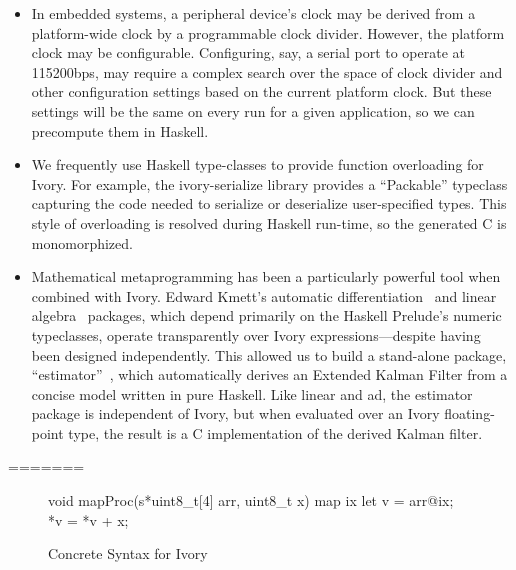 \begin{itemize}
\item In embedded systems, a peripheral device's clock may be derived from a
  platform-wide clock by a programmable clock divider. However, the platform
  clock may be configurable. Configuring, say, a serial port to operate at
  115200bps, may require a complex search over the space of clock divider and
  other configuration settings based on the current platform clock. But these
  settings will be the same on every run for a given application, so we can
  precompute them in Haskell.
\item We frequently use Haskell type-classes to provide function overloading for
  Ivory. For example, the ivory-serialize library provides a ``Packable''
  typeclass capturing the code needed to serialize or deserialize user-specified
  types. This style of overloading is resolved during Haskell run-time, so the
  generated C is monomorphized.
\item Mathematical metaprogramming has been a particularly powerful tool when combined
with Ivory. Edward Kmett's automatic differentiation~\cite{ad} and linear
algebra~\cite{linear} packages, which depend primarily on the Haskell Prelude's
numeric typeclasses, operate transparently over Ivory expressions---despite
having been designed independently. This allowed us to build a stand-alone
package, ``estimator''~\cite{estimator}, which automatically derives an Extended
Kalman Filter from a concise model written in pure Haskell. Like linear and ad,
the estimator package is independent of Ivory, but when evaluated over an Ivory
floating-point type, the result is a C implementation of the derived Kalman
filter.
\end{itemize}
=======

\begin{figure}[h!]
\begin{code}
void mapProc(s*uint8_t[4] arr, uint8_t x) {
  map ix {
    let v = arr@ix;
    *v = *v + x;
  }
}
\end{code}
  \caption{Concrete Syntax for Ivory}
  \label{fig:concrete}
\end{figure}

